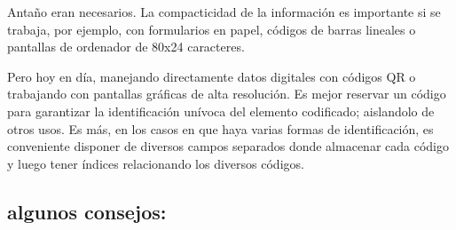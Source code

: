 \documentclass[spanish,12pt,a4paper,final,oneside]{book}
\begin{document}
Antaño eran necesarios.  La compacticidad de la información es importante si se trabaja, por ejemplo, con formularios en papel, códigos de barras lineales o pantallas de ordenador de 80x24 caracteres.

Pero hoy en día, manejando directamente datos digitales con códigos QR o trabajando con pantallas gráficas de alta resolución. Es mejor reservar un código para garantizar la identificación unívoca del elemento codificado; aislandolo de otros usos. Es más, en los casos en que haya varias formas de identificación, es conveniente disponer de diversos campos separados donde almacenar cada código y luego tener índices relacionando los diversos códigos.


\subsection{algunos consejos:}
\end{document}
